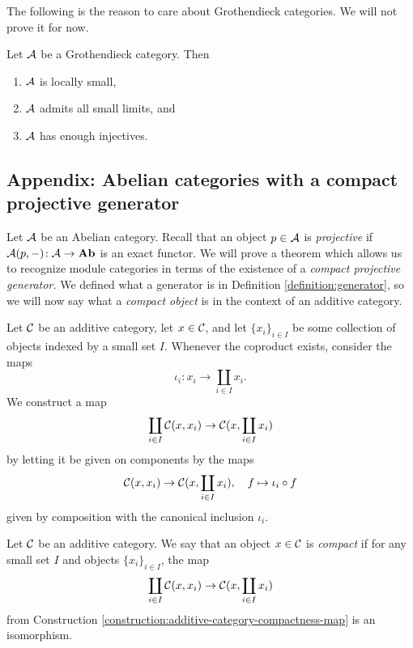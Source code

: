 The following is the reason to care about Grothendieck categories. We will not prove it for now.

\begin{theorem}
	Let \(\mathcal{A}\) be a Grothendieck category. Then
	\begin{enumerate}[label=(\arabic*)]
	\item \(\mathcal{A}\) is locally small,
	\item \(\mathcal{A}\) admits all small limits, and
	\item \(\mathcal{A}\) has enough injectives.
	\end{enumerate}
\end{theorem}

\subsection{Appendix: Abelian categories with a compact projective generator}\label{appendix:abelian-categories-with-a-compact-projective-generator}
Let \(\mathcal{A}\) be an Abelian category. Recall that an object \(p\in\mathcal{A}\) is \emph{projective} if \(\mathcal{A}(p,-)\!:\mathcal{A}\to\mathbf{Ab}\) is an exact functor.
We will prove a theorem which allows us to recognize module categories in terms of the existence of a \emph{compact projective generator.} We defined what
a generator is in Definition \ref{definition:generator}, so we will now say what a \emph{compact object} is in the context of an additive category.
\begin{construction}\label{construction:additive-category-compactness-map}
	Let \(\mathcal{C}\) be an additive category, let \(x\in\mathcal{C}\), and let \(\{x_i\}_{i\in I}\) be some collection of objects indexed by a small set \(I\).
	Whenever the coproduct exists, consider the maps
	\[ \iota_i\!: x_i \to \coprod_{i\in I}x_i. \]
	We construct a map
	\[ \coprod_{i\in I}\mathcal{C}(x,x_i) \to \mathcal{C}(x,\coprod_{i\in I}x_i) \]
	by letting it be given on components by the maps
	\[ \mathcal{C}(x,x_i) \to \mathcal{C}(x,\coprod_{i\in I}x_i),\quad f \mapsto \iota_i\circ f \]
	given by composition with the canonical inclusion \(\iota_i\).
\end{construction}
\begin{definition}
	Let \(\mathcal{C}\) be an additive category. We say that an object \(x\in\mathcal{C}\) is \emph{compact} if for any small set \(I\) and objects \(\{x_i\}_{i\in I}\), the map
	\[ \coprod_{i\in I}\mathcal{C}(x,x_i) \to \mathcal{C}(x,\coprod_{i\in I}x_i) \]
	from Construction \ref{construction:additive-category-compactness-map} is an isomorphism.
\end{definition}
